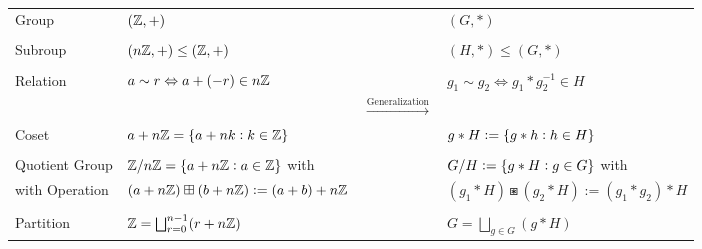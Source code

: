 \documentclass[11pt,openany]{article}
\begin{document}
\vfill
\begin{note}
\ \begin{table}[h!]\centering
\begin{tabular}{l|lcl}
	{Group} & $(\mathbb{Z},+)$ & & $(G,\ast)$ \\ \\
	{Subroup} & $(n\mathbb{Z},+)\leq(\mathbb{Z},+)$ & & $(H,\ast)\leq (G,\ast)$ \\ 
	\\
	{Relation} & $a\sim r\Leftrightarrow a+(-r)\in n\mathbb{Z}$& & $g_1\sim g_2\Leftrightarrow g_1\ast g_2^{-1}\in H$
	\\ 
	& & $\xrightarrow{\text{Generalization}}$ & \\
	{Coset} & $a+n\mathbb{Z}=\set[0]{a+nk:k\in\mathbb{Z}}$ & & $g\ast H:=\set[0]{g\ast h:h\in H}$ \\ \\
	{Quotient Group} & $\mathbb{Z}/n\mathbb{Z}=\set{a+n\mathbb{Z}:a\in\mathbb{Z}}$ with & & $G/H:=\set{g\ast H:g\in G}$ with \\
	{with Operation} & $(a+n\mathbb{Z})\boxplus(b+n\mathbb{Z}):=(a+b)+n\mathbb{Z}$ & & $(g_1\ast H)\boxast(g_2\ast H):=(g_1\ast g_2)\ast H$\\ \\
	{Partition} & $\mathbb{Z}=\bigsqcup_{r=0}^{n-1}(r+n\mathbb{Z})$ & & $G=\bigsqcup_{g\in G}(g\ast H)$
\end{tabular}
\end{table}
\end{note}
\end{document}
